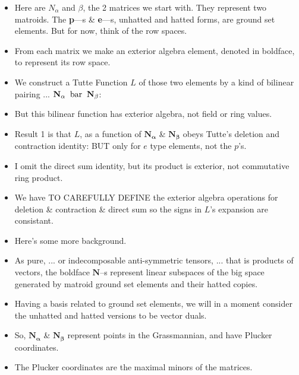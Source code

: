 \documentclass[14pt]{extarticle}
\begin{document}
{\bf
  \begin{itemize}
  \item Here are $N_\alpha$ and $\beta$, the 2 matrices we start with.
    They represent two matroids.  The \textbf{p}---s \&
    \textbf{e}---s, unhatted and hatted forms, are ground set elements.
    But for now, think of the row spaces.

  \item From each matrix we make an exterior algebra element, denoted in boldface,
    to represent its row space.

  \item We construct a Tutte Function $L$ of those two elements by a
    kind of bilinear pairing ... 
  $\mathbf{N_\alpha} \text{\;\;bar\;\;} \mathbf{N_\beta}$:

\item But this bilinear function has exterior algebra, not field or ring values. 

\item Result 1 is that $L$, as a function of $\mathbf{N_\alpha}$ \&
  $\mathbf{N_\beta}$ obeys Tutte's deletion and contraction identity:  BUT
  only for $e$ type elements, not the $p$'s.

\item I omit the direct sum identity, but its product is exterior, not
  commutative ring product.

\item We have TO CAREFULLY DEFINE the exterior algebra operations for deletion \&
  contraction \& direct sum so the signs in $L$'s expansion are consistant.

\item Here's some more background.
  
\item
  As pure, ... or indecomposable anti-symmetric tensors, ... that is 
  products of vectors, the boldface
  $\mathbf{N}$--s represent linear subspaces of the big space generated
  by matroid ground set elements and their hatted copies.  

\item  Having a basis related to ground set elements, we will in a moment
  consider the unhatted and hatted versions to be vector duals.

\item
  So, $\mathbf{N_\alpha}$ \& $\mathbf{N_\beta}$ represent points in the
  Grassmannian, and have Plucker coordinates.

\item
  The Plucker coordinates are the maximal minors of the matrices.


\end{itemize}}
\end{document}

